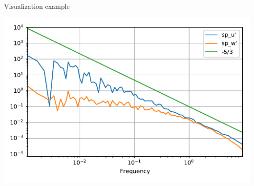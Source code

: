 \begin{exampleblock}{Visualization example}
    \begin{center}
    \includegraphics[width=.83\columnwidth]{pprog/spec.pdf}
    \end{center}
    \end{exampleblock}

    
